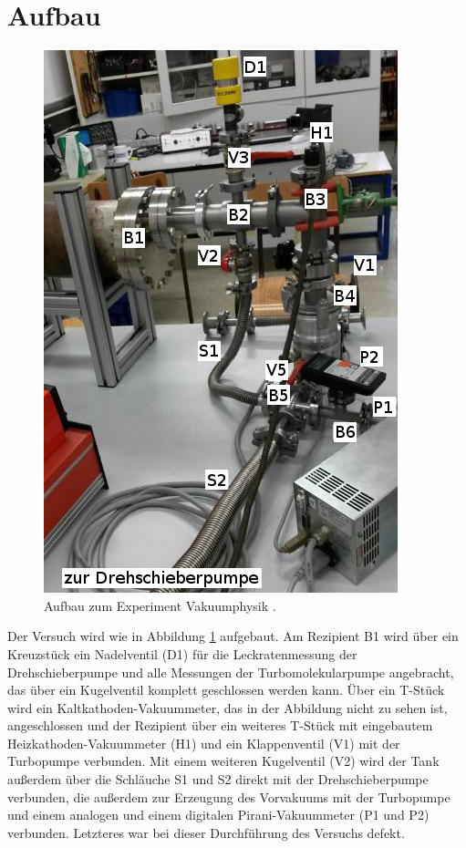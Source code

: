 
\section{Aufbau}
\label{sec:Aufbau}

\begin{figure}
\vspace{-0.5cm}
\includegraphics[scale=0.5]{content/images/Aufbau2.jpg}
\caption{Aufbau zum Experiment Vakuumphysik \cite{V70}.}
\label{fig:Aufbau}
\end{figure}

Der Versuch wird wie in Abbildung \ref{fig:Aufbau} aufgebaut. Am Rezipient B1 wird über ein Kreuzstück ein Nadelventil (D1) für die Leckratenmessung der Drehschieberpumpe und alle Messungen der Turbomolekularpumpe angebracht, das über ein Kugelventil komplett geschlossen werden kann. Über ein T-Stück wird ein Kaltkathoden-Vakuummeter, das in der Abbildung nicht zu sehen ist, angeschlossen und der Rezipient über ein weiteres T-Stück mit eingebautem Heizkathoden-Vakuummeter (H1) und ein Klappenventil (V1) mit der Turbopumpe verbunden. Mit einem weiteren Kugelventil (V2) wird der Tank außerdem über die Schläuche S1 und S2 direkt mit der Drehschieberpumpe verbunden, die außerdem zur Erzeugung des Vorvakuums mit der Turbopumpe und einem analogen und einem digitalen Pirani-Vakuummeter (P1 und P2) verbunden. Letzteres war bei dieser Durchführung des Versuchs defekt.


